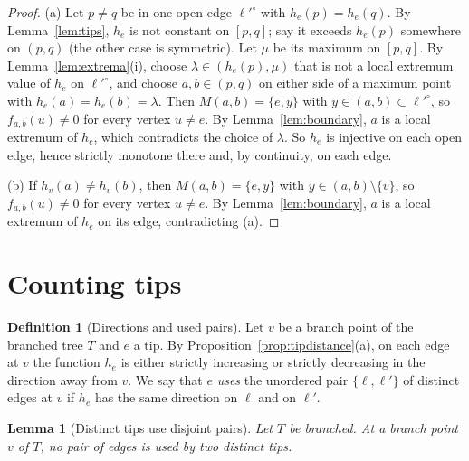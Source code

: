 \documentclass[11pt]{amsart}
\newtheorem{lemma}[theorem]{Lemma}
\theoremstyle{definition}
\newtheorem{definition}[theorem]{Definition}
\theoremstyle{remark}
\newcommand{\M}{M}
\begin{document}
\begin{proof}
(a) Let $p\ne q$ be in one open edge $\ell'^\circ$ with $h_e(p)=h_e(q)$. By Lemma~\ref{lem:tips}, $h_e$ is not constant on $[p,q]$; say it exceeds $h_e(p)$ somewhere on $(p,q)$ (the other case is symmetric). Let $\mu$ be its maximum on $[p,q]$. By Lemma~\ref{lem:extrema}(i), choose $\lambda\in(h_e(p),\mu)$ that is not a local extremum value of $h_e$ on $\ell'^\circ$, and choose $a,b\in(p,q)$ on either side of a maximum point with $h_e(a)=h_e(b)=\lambda$. Then $\M(a,b)=\{e,y\}$ with $y\in(a,b)\subset \ell'^\circ$, so $f_{a,b}(u)\ne0$ for every vertex $u\ne e$. By Lemma~\ref{lem:boundary}, $a$ is a local extremum of $h_e$, which contradicts the choice of $\lambda$. So $h_e$ is injective on each open edge, hence strictly monotone there and, by continuity, on each edge.

(b) If $h_v(a)\ne h_v(b)$, then $\M(a,b)=\{e,y\}$ with $y\in(a,b)\setminus\{v\}$, so $f_{a,b}(u)\ne0$ for every vertex $u\ne e$. By Lemma~\ref{lem:boundary}, $a$ is a local extremum of $h_e$ on its edge, contradicting (a).
\end{proof}

\section{Counting tips}\label{sec:count}

\begin{definition}[Directions and used pairs]\label{def:uses}
Let $v$ be a branch point of the branched tree $T$ and $e$ a tip. By Proposition~\ref{prop:tipdistance}(a), on each edge at $v$ the function $h_e$ is either strictly increasing or strictly decreasing in the direction away from $v$. We say that $e$ \emph{uses} the unordered pair $\{\ell,\ell'\}$ of distinct edges at $v$ if $h_e$ has the same direction on $\ell$ and on $\ell'$.
\end{definition}

\begin{lemma}[Distinct tips use disjoint pairs]\label{lem:pairs}
Let $T$ be branched. At a branch point $v$ of $T$, no pair of edges is used by two distinct tips.
\end{lemma}
\end{document}
